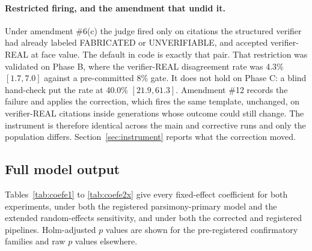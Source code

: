 \paragraph{Restricted firing, and the amendment that undid it.}
Under amendment \#6(c) the judge fired only on citations the structured verifier
had already labeled FABRICATED or UNVERIFIABLE, and accepted verifier-REAL at
face value. The default in code is exactly that pair. That restriction was
validated on Phase B, where the verifier-REAL disagreement rate was 4.3\%
$[1.7, 7.0]$ against a pre-committed 8\% gate. It does not hold on Phase C: a
blind hand-check put the rate at 40.0\% $[21.9, 61.3]$. Amendment \#12 records
the failure and applies the correction, which fires the same template, unchanged,
on verifier-REAL citations inside generations whose outcome could still change.
The instrument is therefore identical across the main and corrective runs and
only the population differs. Section~\ref{sec:instrument} reports what the
correction moved.

\subsection{Full model output}

%

Tables~\ref{tab:coefe1} to \ref{tab:coefe2x} give every fixed-effect
coefficient for both experiments, under both the registered parsimony-primary
model and the extended random-effects sensitivity, and under both the corrected
and registered pipelines. Holm-adjusted $p$ values are shown for the
pre-registered confirmatory families and raw $p$ values elsewhere.

